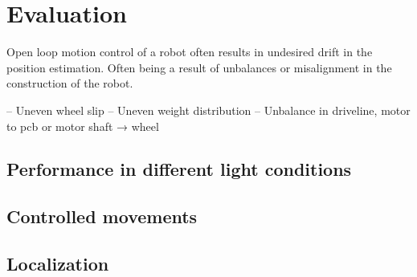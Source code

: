 \chapter{Evaluation} 

Open loop motion control of a robot often results in undesired drift in the position estimation.
Often being a result of unbalances or misalignment in the construction of the robot.

– Uneven wheel slip
– Uneven weight distribution
– Unbalance in driveline, motor to pcb or motor shaft → wheel


\section{Performance in different light conditions}



\section{Controlled movements}




\section{Localization}






